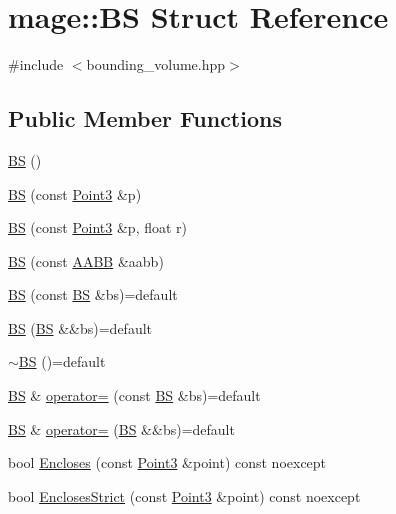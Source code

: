 \hypertarget{structmage_1_1_b_s}{}\section{mage\+:\+:BS Struct Reference}
\label{structmage_1_1_b_s}


{\ttfamily \#include $<$bounding\+\_\+volume.\+hpp$>$}

\subsection*{Public Member Functions}
\begin{DoxyCompactItemize}
\item 
\hyperlink{structmage_1_1_b_s_aa34921d9ea23b9a724ddf739b3adabfa}{BS} ()
\item 
\hyperlink{structmage_1_1_b_s_ae64c575576180fb6409125c8792c2d29}{BS} (const \hyperlink{structmage_1_1_point3}{Point3} \&p)
\item 
\hyperlink{structmage_1_1_b_s_a23be36778ebc6b31fcfb31fb032fdb0e}{BS} (const \hyperlink{structmage_1_1_point3}{Point3} \&p, float r)
\item 
\hyperlink{structmage_1_1_b_s_adb709aad7bd4b6816ae59ec87221bd6a}{BS} (const \hyperlink{structmage_1_1_a_a_b_b}{A\+A\+BB} \&aabb)
\item 
\hyperlink{structmage_1_1_b_s_a01cf5aaeae2a87c56527a338889f5079}{BS} (const \hyperlink{structmage_1_1_b_s}{BS} \&bs)=default
\item 
\hyperlink{structmage_1_1_b_s_a8974a41ba4a204e1b7ad5a218f9629e8}{BS} (\hyperlink{structmage_1_1_b_s}{BS} \&\&bs)=default
\item 
\hyperlink{structmage_1_1_b_s_a111f60f8ab53c7497ff7aaa743619829}{$\sim$\+BS} ()=default
\item 
\hyperlink{structmage_1_1_b_s}{BS} \& \hyperlink{structmage_1_1_b_s_aef60d898cb44bbf1e3988351b5717faa}{operator=} (const \hyperlink{structmage_1_1_b_s}{BS} \&bs)=default
\item 
\hyperlink{structmage_1_1_b_s}{BS} \& \hyperlink{structmage_1_1_b_s_a751360f4d52fe40f6f07f29a759c9f0c}{operator=} (\hyperlink{structmage_1_1_b_s}{BS} \&\&bs)=default
\item 
bool \hyperlink{structmage_1_1_b_s_a0050f2e110b107ae98bb9f33e3386758}{Encloses} (const \hyperlink{structmage_1_1_point3}{Point3} \&point) const noexcept
\item 
bool \hyperlink{structmage_1_1_b_s_adcbd276fc5ecb48367b83da5a42defd4}{Encloses\+Strict} (const \hyperlink{structmage_1_1_point3}{Point3} \&point) const noexcept

\end{DoxyCompactItemize}

